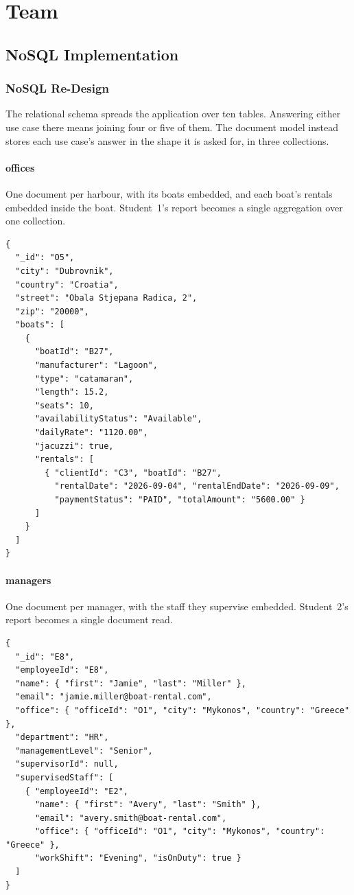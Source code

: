 \documentclass[a4paper, 11pt]{article}          %
\begin{document}
\pagebreak

\section*{Team}

\subsection{NoSQL Implementation}

\subsubsection{NoSQL Re-Design}

The relational schema spreads the application over ten tables. Answering either
use case there means joining four or five of them. The document model instead
stores each use case's answer in the shape it is asked for, in three
collections.

\paragraph{offices} One document per harbour, with its boats embedded, and each
boat's rentals embedded inside the boat. Student~1's report becomes a single
aggregation over one collection.

\begin{lstlisting}
{
  "_id": "O5",
  "city": "Dubrovnik",
  "country": "Croatia",
  "street": "Obala Stjepana Radica, 2",
  "zip": "20000",
  "boats": [
    {
      "boatId": "B27",
      "manufacturer": "Lagoon",
      "type": "catamaran",
      "length": 15.2,
      "seats": 10,
      "availabilityStatus": "Available",
      "dailyRate": "1120.00",
      "jacuzzi": true,
      "rentals": [
        { "clientId": "C3", "boatId": "B27",
          "rentalDate": "2026-09-04", "rentalEndDate": "2026-09-09",
          "paymentStatus": "PAID", "totalAmount": "5600.00" }
      ]
    }
  ]
}
\end{lstlisting}

\paragraph{managers} One document per manager, with the staff they supervise
embedded. Student~2's report becomes a single document read.

\begin{lstlisting}
{
  "_id": "E8",
  "employeeId": "E8",
  "name": { "first": "Jamie", "last": "Miller" },
  "email": "jamie.miller@boat-rental.com",
  "office": { "officeId": "O1", "city": "Mykonos", "country": "Greece" },
  "department": "HR",
  "managementLevel": "Senior",
  "supervisorId": null,
  "supervisedStaff": [
    { "employeeId": "E2",
      "name": { "first": "Avery", "last": "Smith" },
      "email": "avery.smith@boat-rental.com",
      "office": { "officeId": "O1", "city": "Mykonos", "country": "Greece" },
      "workShift": "Evening", "isOnDuty": true }
  ]
}
\end{lstlisting}
\end{document}
